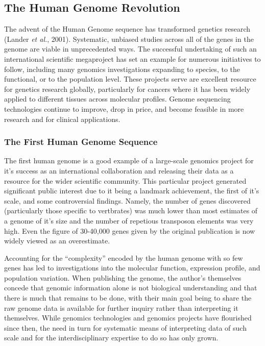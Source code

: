 \subsection{The Human Genome Revolution}
The advent of the Human Genome sequence has transformed genetics research (Lander \textit{et al.}, 2001). Systematic, unbiased studies across all of the genes in the genome are viable in unprecedented ways. The successful undertaking of such an international scientific megaproject has set an example for numerous initiatives to follow, including many genomics investigations expanding to species, to the functional, or to the population level. These projects serve are excellent resource for genetics research globally, particularly for cancers where it has been widely applied to different tissues across molecular profiles. Genome sequencing technologies continue to improve, drop in price, and become feasible in more research and for clinical applications.

\subsubsection{The First Human Genome Sequence}
The first human genome is a good example of a large-scale genomics project for it's success as an international collaboration and releasing their data as a resource for the wider scientific community. This particular project generated significant public interest due to it being a landmark achievement, the first of it's scale, and some controversial findings. Namely, the number of genes discovered (particularly those specific to vertbrates) was much lower than most estimates of a genome of it's size and the number of repetious transposon elements was very high. Even the figure of 30-40,000 genes given by the original publication is now widely viewed as an overestimate. 

Accounting for the ``complexity'' encoded by the human genome with so few genes has led to investigations into the molecular function, expression profile, and population variation. When publishing the genome, the author's themselves concede that genomic information alone is not biological understanding and that there is much that remains to be done, with their main goal being to share the raw genome data is available for further inquiry rather than interpreting it themselves. While genomics technologies and genomics projects have flourished since then, the need in turn for systematic means of interpreting data of such scale and for the interdisciplinary expertise to do so has only grown. 

